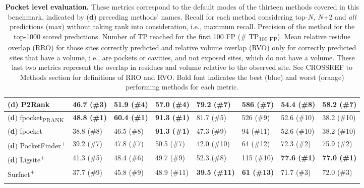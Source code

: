 \begin{landscape}
\begin{longtable}[c]{|M{29mm}|M{29mm}|M{31mm}|M{27mm}|M{30mm}|M{19mm}|M{18mm}|M{18mm}|}
\footnotesize{(\textbf{d})} P2Rank         & 46.7 (\#3)            & 51.9 (\#4)             & 57.0 (\#4)           & 79.2 (\#7)           & 586 (\#7)         & 54.4 (\#8)     & 58.2 (\#7)   \\ \hline
\footnotesize{(\textbf{d})} fpocket\textsubscript{PRANK}        & \textbf{\textcolor{CBBlue}{48.8 (\#1)}}           & \textbf{\textcolor{CBBlue}{60.4 (\#1)}}             & \textbf{\textcolor{CBBlue}{91.3 (\#1)}}         & 81.7 (\#5)           & 526 (\#9)          & 52.6 (\#10)     & 38.2 (\#10)     \\ \hline
\footnotesize{(\textbf{d})} fpocket        & 38.8 (\#8)           & 46.5 (\#8)             & \textbf{\textcolor{CBBlue}{91.3 (\#1)}}         & 47.3 (\#9)           & 94 (\#11)          & 52.6 (\#10)     & 38.2 (\#10)     \\ \hline
\footnotesize{(\textbf{d})} PocketFinder\textsuperscript{+}  & 39.2 (\#7)           & 47.8 (\#7)             & 50.5 (\#7)         & 42.0 (\#10)             & 64 (\#12)          & 72.3 (\#2)     & 75.9 (\#2)     \\ \hline
\footnotesize{(\textbf{d})} Ligsite\textsuperscript{+}       & 41.3 (\#5)           & 48.4 (\#6)             & 49.7 (\#9)         & 52.3 (\#8)           & 115 (\#10)         & \textbf{\textcolor{CBBlue}{77.6 (\#1)}}             & \textbf{\textcolor{CBBlue}{77.0 (\#1)}}             \\ \hline
Surfnet\textsuperscript{+}       & 37.7 (\#9)           & 45.8 (\#9)             & 48.9 (\#11)         & \textbf{\textcolor{CBOrange}{39.5 (\#11)}}           & \textbf{\textcolor{CBOrange}{61 (\#13)}}                  & 71.7 (\#3)     & 72.0 (\#3)     \\ \hline
\caption[Pocket level evaluation]{\textbf{Pocket level evaluation.} These metrics correspond to the default modes of the thirteen methods covered in this benchmark, indicated by (\textbf{d}) preceding methods' names. Recall for each method considering top-$N$, $N$+2 and \textit{all} predictions (max) without taking rank into consideration, i.e., maximum recall. Precision of the method for the top-1000 scored predictions. Number of TP reached for the first 100 FP (\# TP\textsubscript{100 FP}). Mean relative residue overlap (RRO) for those sites correctly predicted and relative volume overlap (RVO) only for correctly predicted sites that have a volume, i.e., are pockets or cavities, and not exposed sites, which do not have a volume. These last two metrics represent the overlap in residues and volume relative to the observed site. See CROSSREF to Methods section for definitions of RRO and RVO. Bold font indicates the best (blue) and worst (orange) performing methods for each metric.}
\label{tab:pocket_level_benchmark}\\
\end{longtable}
\end{landscape}

